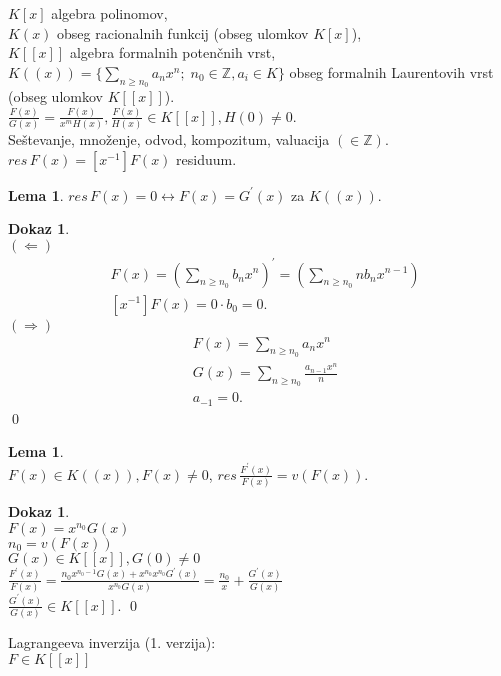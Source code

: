 \documentclass[a4paper, 12pt]{book}
\theoremstyle{definition}
\newtheorem{lemma}[counter]{Lema}
\newtheorem{pro}[counter]{Dokaz}
\theoremstyle{remark}
\newcommand{\Z}{\mathbb{Z}}
\begin{document}
$K[x]$ algebra polinomov, \\
$K(x)$ obseg racionalnih funkcij (obseg ulomkov $K[x]$), \\
$K[[x]]$ algebra formalnih potenčnih vrst, \\
$K((x)) = \{\sum_{n \geq n_0} a_n x^n; \; n_0 \in \Z, a_i \in K\}$ obseg formalnih Laurentovih vrst (obseg ulomkov $K[[x]]$). \\
$\frac{F(x)}{G(x)} = \frac{F(x)}{x^m H(x)}, \frac{F(x)}{H(x)} \in K[[x]], H(0) \neq 0$. \\
Seštevanje, množenje, odvod, kompozitum, valuacija $(\in \Z)$. \\
$res \, F(x) = [x^{-1}] F(x)$ residuum.
\begin{lemma}
  $res \, F(x) = 0 \leftrightarrow F(x) = G^{'}(x)$ za $K((x))$.
\end{lemma}
\begin{pro} \text{} \\
  $(\Longleftarrow)$
  \begin{align*}
    &F(x) = \left(\sum_{n \geq n_0} b_n x^n \right)^{'} = \left(\sum_{n \geq n_0} n b_n x^{n-1} \right) \\
    &[x^{-1}] F(x) = 0 \cdot b_0 = 0.
  \end{align*}
  $(\Longrightarrow)$
  \begin{align*}
    &F(x) = \sum_{n \geq n_0} a_n x^n \\
    &G(x) = \sum_{n \geq n_0} \frac{a_{n-1} x^n}{n} \\
    &a_{-1} = 0.
  \end{align*}
  \qed
\end{pro}
\begin{lemma} \text{} \\
  $F(x) \in K((x)), F(x) \neq 0$,
  $res \, \frac{F^{'}(x)}{F(x)} = v(F(x))$.
\end{lemma}
\begin{pro} \text{} \\
  $F(x) = x^{n_0} G(x)$ \\
  $n_0 = v(F(x))$ \\
  $G(x) \in K[[x]], G(0) \neq 0$ \\
  $\frac{F^{'}(x)}{F(x)} = \frac{n_0 x^{n_0 - 1} G(x) + x^{n_0} x^{n_0} G^{'}(x)}{x^{n_0} G(x)} = \frac{n_0}{x} + \frac{G^{'}(x)}{G(x)}$ \\
  $\frac{G^{'}(x)}{G(x)} \in K[[x]]$.
  \qed
\end{pro}
Lagrangeeva inverzija (1. verzija): \\
$F \in K[[x]]$ \\
\end{document}
